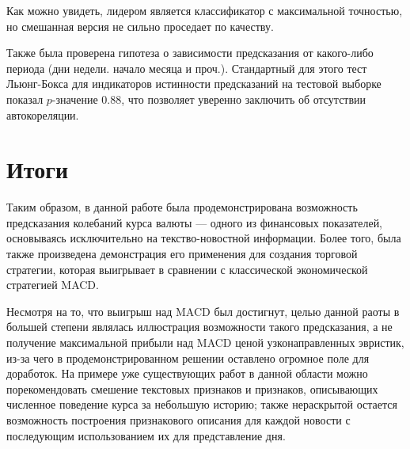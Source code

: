 \documentclass[pdftex,ptm,14pt,a4paper]{report}
\begin{document}
Как можно увидеть, лидером является классификатор с максимальной точностью, но смешанная версия не сильно проседает по качеству.

Также была проверена гипотеза о зависимости предсказания от какого-либо периода (дни недели. начало месяца и проч.).
Стандартный для этого тест Льюнг-Бокса\cite{ljungbox} для индикаторов истинности предсказаний на тестовой выборке
показал $p$-значение 0.88, что позволяет уверенно заключить об отсутствии автокореляции.

\chapter{Итоги}

Таким образом, в данной работе была продемонстрирована возможность предсказания колебаний курса
валюты --- одного из финансовых показателей, основываясь исключительно на текство-новостной информации.
Более того, была также произведена демонстрация его применения для создания торговой стратегии,
которая выигрывает в сравнении с классической экономической стратегией MACD.

Несмотря на то, что выигрыш над MACD был достигнут, целью данной раоты в большей степени являлась иллюстрация
возможности такого предсказания, а не получение максимальной прибыли над MACD ценой узконаправленных эвристик,
из-за чего в продемонстрированном решении оставлено огромное поле для доработок.
На примере уже существующих работ в данной области можно порекомендовать смешение текстовых признаков и признаков,
описывающих численное поведение курса за небольшую историю; также нераскрытой остается возможность построения признакового
описания для каждой новости с последующим использованием их для представление дня.

{}

\end{document}
